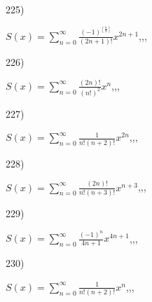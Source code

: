 \documentclass[11pt, ukrainian]{article}
\begin{document}
\par
\vspace{0.9cm}
225) \space 
{%
{$S(x)=\sum\limits_{n=0}^{\infty}{\frac{(-1)^{[\frac{n}{2}]}}{(2n+1)!}}{x^{{2n+1}}}$},,, \par \smallskip  
}
\par
\vspace{0.9cm}
226) \space 
{%
{$S(x)=\sum\limits_{n=0}^{\infty}{\frac{(2n)!}{(n!)^2}}{x^{n}}$},,, \par \smallskip  
}
\par
\vspace{0.9cm}
227) \space 
{%
{$S(x)=\sum\limits_{n=0}^{\infty}{\frac{1}{n!(n+2)!}}{x^{{2n}}}$},,, \par \smallskip  
}
\par
\vspace{0.9cm}
228) \space 
{%
{$S(x)=\sum\limits_{n=0}^{\infty}{\frac{(2n)!}{n!(n+3)!}}{x^{{n+3}}}$},,, \par \smallskip  
}
\par
\vspace{0.9cm}
229) \space 
{%
{$S(x)=\sum\limits_{n=0}^{\infty}{\frac{(-1)^n}{4n+1}}{x^{{4n+1}}}$},,, \par \smallskip  
}
\par
\vspace{0.9cm}
230) \space 
{%
{$S(x)=\sum\limits_{n=0}^{\infty}{\frac{1}{n!(n+2)!}}{x^{{n}}}$},,, \par \smallskip  
}
\end{document}
